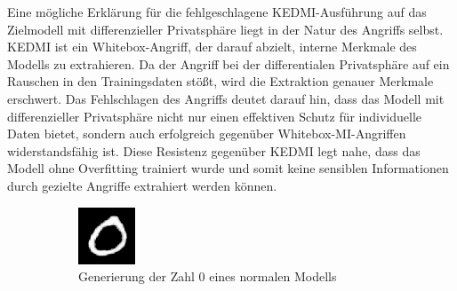 Eine mögliche Erklärung für die fehlgeschlagene KEDMI-Ausführung auf das Zielmodell mit differenzieller Privatsphäre liegt in der Natur des Angriffs selbst. KEDMI ist ein Whitebox-Angriff, der darauf abzielt, interne Merkmale des Modells zu extrahieren. Da der Angriff bei der differentialen Privatsphäre auf ein Rauschen in den Trainingsdaten stößt, wird die Extraktion genauer Merkmale erschwert. Das Fehlschlagen des Angriffs deutet darauf hin, dass das Modell mit differenzieller Privatsphäre nicht nur einen effektiven Schutz für individuelle Daten bietet, sondern auch erfolgreich gegenüber Whitebox-MI-Angriffen widerstandsfähig ist. Diese Resistenz gegenüber KEDMI legt nahe, dass das Modell ohne Overfitting trainiert wurde und somit keine sensiblen Informationen durch gezielte Angriffe extrahiert werden können.

\begin{figure}[H]
	\centering
	\begin{subfigure}[b]{0.35\linewidth}
		\includegraphics[width=\linewidth]{Bilder/0_rbmi.png}
		\caption{Generierung der Zahl 0 eines normalen Modells}
		\label{img:rbmi_0}
	\end{subfigure}
	\hspace{1cm} %
	\begin{subfigure}[b]{0.35\linewidth}

\end{subfigure}
\end{figure}
